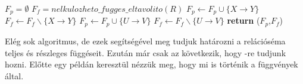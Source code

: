 \begin{algorithmic}
    \State $F_p = \emptyset$
    \State $F_f = nelkulozheto\_fugges\_eltavolito(R)$
            \State $F_p \gets F_p \cup \{ X \rightarrow Y \}$
            \State $F_f \gets F_f \backslash \{X \rightarrow Y\}$
        \EndIf
            \State $F_p \gets F_p \cup \{U \rightarrow V\}$
            \State $F_f \gets F_f \backslash \{U \rightarrow V\}$
        \EndWhile
    \EndFor
    \State \textbf{return} ($F_p$,$F_f$) 
    \EndFunction
    \hfill \break
\end{algorithmic}

Elég sok algoritmus, de ezek segítségével meg tudjuk határozni a relációséma teljes és részleges függéseit. Ezután már csak az következik, hogy \nfk-re tudjunk hozni. Előtte egy példán keresztül nézzük meg, hogy mi is történik a függvények által.

